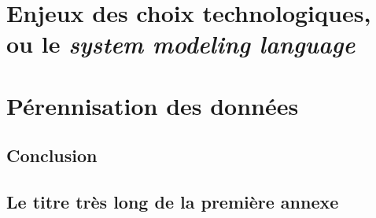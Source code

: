 \documentclass[a4paper,12pt,twoside]{book}
\begin{document}
    
    
    
	
	\part{Enjeux des choix technologiques, ou le \textit{system modeling language}}
    
    
    

    \part{Pérennisation des données}
	
	
	
	\chapter*{Conclusion}
	
	\appendix
	\chapter[Titre court]{Le titre très long de la première annexe}
	
	\backmatter





	\tableofcontents
	
\end{document}
